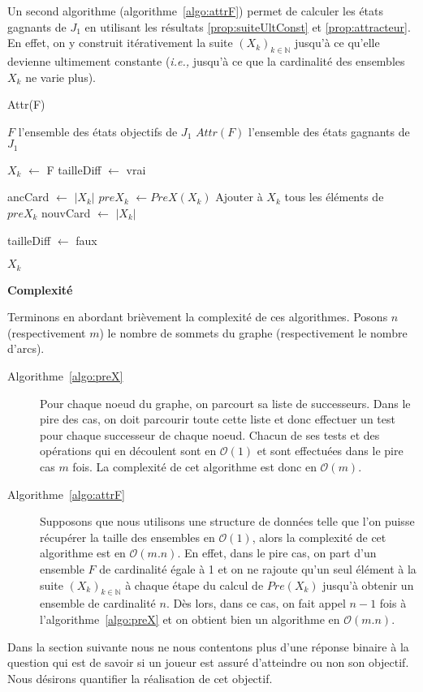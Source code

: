 Un second algorithme (algorithme~\ref{algo:attrF}) permet de calculer les états gagnants de $J_{1}$ en utilisant les résultats \ref{prop:suiteUltConst} et \ref{prop:attracteur}. En effet, on y construit itérativement la suite $(X_{k})_{k \in \mathbb{N}}$ jusqu'à ce qu'elle devienne ultimement constante (\emph{i.e.,} jusqu'à ce que la cardinalité des ensembles $X_{k}$ ne varie plus).

\begin{algorithm}
	\caption{Attr(F)}
	\label{algo:attrF}
	\begin{algorithmic}[1]
		\REQUIRE $F$ l'ensemble des états objectifs de $J_{1}$
		\ENSURE $Attr(F)$ l'ensemble des états gagnants de $J_{1}$
		
		\STATE $X_{k}$ $\leftarrow$ F
		\STATE tailleDiff $\leftarrow$ vrai
		
			\STATE ancCard $\leftarrow$ $|X_{k}|$
			\STATE $preX_{k}$ $\leftarrow PreX(X_{k})$
			\STATE Ajouter à $X_{k}$ tous les éléments de $preX_{k}$
			\STATE nouvCard $\leftarrow$ $|X_{k}|$
			
				\STATE tailleDiff $\leftarrow$ faux
			\ENDIF
		\ENDWHILE
		
		\RETURN $X_{k}$
\end{algorithmic}
\end{algorithm}
$ $\\

\noindent\textbf{Complexité}

Terminons en abordant brièvement la complexité de ces algorithmes. Posons $n$ (respectivement $m$) le nombre de sommets du graphe (respectivement le nombre d'arcs).
\begin{description}
	\item[Algorithme~\ref{algo:preX}] Pour chaque noeud du graphe, on parcourt sa liste de successeurs. Dans le pire des cas, on doit parcourir toute cette liste et donc effectuer un test pour chaque successeur de chaque noeud. Chacun de ses tests et des opérations qui en découlent sont en $\mathcal{O}(1)$ et sont effectuées dans le pire cas $m$ fois. La complexité de cet algorithme est donc en $\mathcal{O}(m)$.
	
	\item[Algorithme~\ref{algo:attrF}] Supposons que nous utilisons une structure de données telle que l'on puisse récupérer la taille des ensembles en $\mathcal{O}(1)$, alors la complexité de cet algorithme est en $\mathcal{O}(m.n)$. En effet, dans le pire cas, on part d'un ensemble $F$ de cardinalité égale à 1 et on ne rajoute qu'un seul élément à la suite $(X_k)_{k \in \mathbb{N}}$ à chaque étape du calcul de $Pre(X_k)$ jusqu'à obtenir un ensemble de cardinalité $n$. Dès lors, dans ce cas, on fait appel $n-1$ fois à l'algorithme~\ref{algo:preX} et on obtient bien un algorithme en $\mathcal{O}(m.n)$.

	
\end{description}

Dans la section suivante nous ne nous contentons plus d'une réponse binaire à la question qui est de savoir si un joueur est assuré d'atteindre ou non son objectif. Nous désirons quantifier la réalisation de cet objectif. 

\FloatBarrier


